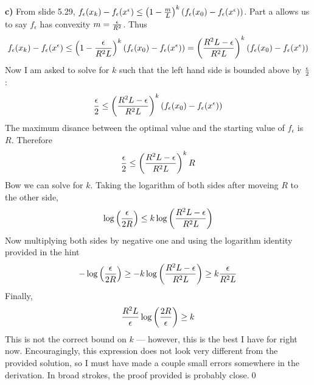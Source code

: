 {\bf c)} From slide 5.29, $f_\epsilon(x_k)-f_\epsilon(x^\epsilon)\leq\left(1-{m\over L}\right)^k(f_\epsilon(x_0)-f_\epsilon(x^\epsilon))$.
Part a allows us to say $f_\epsilon$ has convexity $m={\epsilon\over R^2}$.
Thus
$$f_\epsilon(x_k)-f_\epsilon(x^\epsilon)\leq\left(1-{\epsilon\over R^2L}\right)^k(f_\epsilon(x_0)-f_\epsilon(x^\epsilon))=\left({R^2L-\epsilon\over R^2L}\right)^k(f_\epsilon(x_0)-f_\epsilon(x^\epsilon))$$
Now I am asked to solve for $k$ such that the left hand side is bounded above by $\epsilon\over2$:
$${\epsilon\over2}\leq\left({R^2L-\epsilon\over R^2L}\right)^k(f_\epsilon(x_0)-f_\epsilon(x^\epsilon))$$
The maximum disance between the optimal value and the starting value of $f_\epsilon$ is $R$. Therefore
$${\epsilon\over2}\leq\left({R^2L-\epsilon\over R^2L}\right)^kR$$
Bow we can solve for $k$. Taking the logarithm of both sides after moveing $R$ to the other side,
$$\log\left({\epsilon\over2R}\right)\leq k\log\left({R^2L-\epsilon\over R^2L}\right)$$
Now multiplying both sides by negative one and using the logarithm identity provided in the hint
$$-\log\left({\epsilon\over2R}\right)\geq -k\log\left({R^2L-\epsilon\over R^2L}\right)\geq k{\epsilon\over R^2L}$$
Finally,
$${R^2L\over\epsilon}\log\left({2R\over\epsilon}\right)\geq k$$
This is not the correct bound on $k$ --- however, this is the best I have for right now.
Encouragingly, this expression does not look very different from the provided solution, so I must have made a couple small errors somewhere in the derivation.
In broad strokes, the proof provided is probably close.\hfill\qed\kern3pt
\bye
